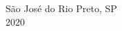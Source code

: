 \begin{center}
	\fontsize{14}{\baselineskip} \selectfont
	\vspace*{\fill}
	São José do Rio Preto, SP \\ \vspace{1.0pt}  
	2020
\end{center}